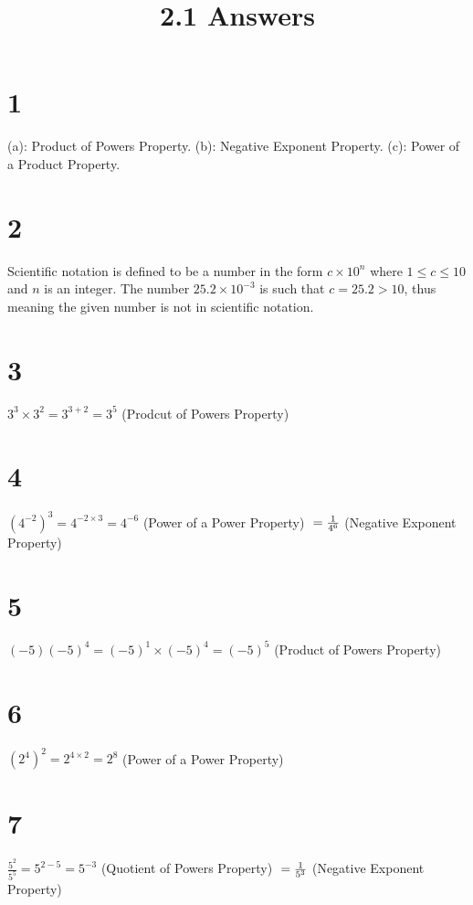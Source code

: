 \documentclass{article}
\title{2.1 Answers}
\theoremstyle{definition}
\begin{document}
\maketitle

\section*{1}
(a): Product of Powers Property.
\newline
(b): Negative Exponent Property.
\newline
(c): Power of a Product Property.

\section*{2}
Scientific notation is defined to be a number in the form $c\times 10^n$ where $1\le c\le 10$ and $n$ is an integer. The number $25.2\times 10^{-3}$ is 
such that $c=25.2>10$, thus meaning the given number is not in scientific notation.

\section*{3}
$3^3\times 3^2=3^{3+2}=3^5$ (Prodcut of Powers Property)

\section*{4}
$(4^{-2})^3=4^{-2\times 3}=4^{-6}$ (Power of a Power Property)
$\newline =\frac{1}{4^6}$ (Negative Exponent Property)

\section*{5}
$(-5)(-5)^4=(-5)^1\times (-5)^4=(-5)^5$ (Product of Powers Property)

\section*{6}
$(2^4)^2=2^{4\times 2}=2^8$ (Power of a Power Property)

\section*{7}
$\frac{5^2}{5^5}=5^{2-5}=5^{-3}$ (Quotient of Powers Property)
$\newline =\frac{1}{5^3}$ (Negative Exponent Property)
\end{document}
